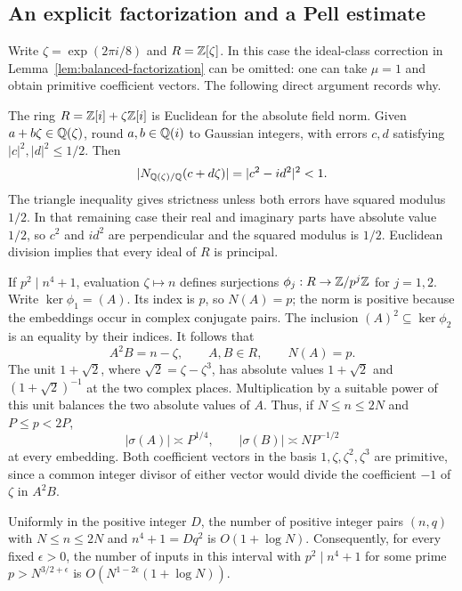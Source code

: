 \subsection{An explicit factorization and a Pell estimate}

Write $\zeta=\exp(2\pi i/8)$ and $R=\mathbb Z[\zeta]$. In this case the
ideal-class correction in Lemma~\ref{lem:balanced-factorization} can
be omitted: one can take $\mu=1$ and obtain primitive coefficient
vectors. The following direct argument records why.

The ring $R=\mathbb Z[i]+\zeta\mathbb Z[i]$ is Euclidean for the absolute field
norm. Given $a+b\zeta\in\mathbb Q(\zeta)$, round $a,b\in\mathbb Q(i)$ to
Gaussian integers, with errors $c,d$ satisfying
$|c|^2,|d|^2\le1/2$. Then
\[
 |N_{\mathbb Q(\zeta)/\mathbb Q}(c+d\zeta)|=|c^2-id^2|^2<1.
\]
The triangle inequality gives strictness unless both errors have
squared modulus $1/2$. In that remaining case their real and
imaginary parts have absolute value $1/2$, so $c^2$ and $id^2$ are
perpendicular and the squared modulus is $1/2$. Euclidean division
implies that every ideal of $R$ is principal.

If $p^2\mid n^4+1$, evaluation $\zeta\mapsto n$ defines
surjections $\phi_j:R\to\mathbb Z/p^j\mathbb Z$ for $j=1,2$. Write
$\ker\phi_1=(A)$. Its index is $p$, so $N(A)=p$; the norm is
positive because the embeddings occur in complex conjugate pairs.
The inclusion $(A)^2\subseteq\ker\phi_2$ is an equality by their
indices. It follows that
\begin{equation}\label{eq:cyclotomic-factorization}
 A^2B=n-\zeta,\qquad A,B\in R,\qquad N(A)=p.
\end{equation}
The unit $1+\sqrt2$, where $\sqrt2=\zeta-\zeta^3$, has absolute
values $1+\sqrt2$ and $(1+\sqrt2)^{-1}$ at the two complex places.
Multiplication by a suitable power of this unit balances the two
absolute values of $A$. Thus, if $N\le n\le2N$ and $P\le p<2P$,
\[
 |\sigma(A)|\asymp P^{1/4},\qquad
 |\sigma(B)|\asymp NP^{-1/2}
\]
at every embedding. Both coefficient vectors in the basis
$1,\zeta,\zeta^2,\zeta^3$ are primitive, since a common integer
divisor of either vector would divide the coefficient $-1$ of
$\zeta$ in $A^2B$.

\begin{lemma}\label{lem:cyclotomic-pell}
Uniformly in the positive integer $D$, the number of positive integer
pairs $(n,q)$ with $N\le n\le2N$ and $n^4+1=Dq^2$ is
$O(1+\log N)$. Consequently, for every fixed $\epsilon>0$, the
number of inputs in this interval with $p^2\mid n^4+1$ for some
prime $p>N^{3/2+\epsilon}$ is
$O(N^{1-2\epsilon}(1+\log N))$.
\end{lemma}

